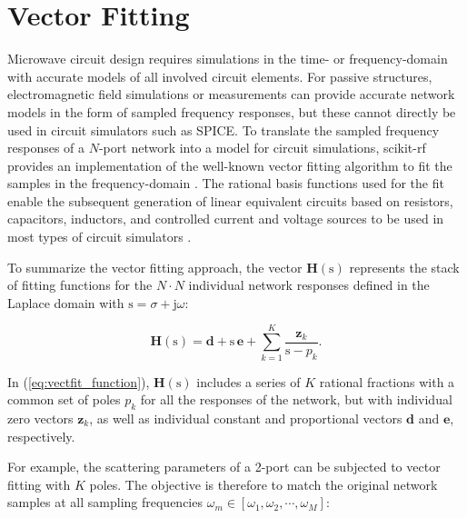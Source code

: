 \documentclass{IEEEjmw}
\begin{document}
\section{Vector Fitting}
Microwave circuit design requires simulations in the time- or frequency-domain with accurate models of all involved circuit elements. For passive structures, electromagnetic field simulations or measurements can provide accurate network models in the form of sampled frequency responses, but these cannot directly be used in circuit simulators such as SPICE. To translate the sampled frequency responses of a $N$-port network into a model for circuit simulations, scikit-rf provides an implementation of the well-known vector fitting algorithm to fit the samples in the frequency-domain \cite{vectfit}. The rational basis functions used for the fit enable the subsequent generation of linear equivalent circuits based on resistors, capacitors, inductors, and controlled current and voltage sources to be used in most types of circuit simulators \cite{vectfit_spice}. 

To summarize the vector fitting approach, the vector $\mathbf{H}(\mathrm{s})$ represents the stack of fitting functions for the $N \cdot N$ individual network responses defined in the Laplace domain with $\mathrm{s} = \sigma + \mathrm{j} \omega$:

\begin{equation}
\mathbf{H}(\mathrm{s}) = \mathbf{d} + \mathrm{s} \, \mathbf{e} + \sum _{k=1} ^{K} \frac{\mathbf{z}_k}{\mathrm{s} - p_k}.
\label{eq:vectfit_function}
\end{equation}

In (\ref{eq:vectfit_function}), $\mathbf{H}(\mathrm{s})$ includes a series of $K$ rational fractions with a common set of poles $p_k$ for all the responses of the network, but with individual zero vectors $\mathbf{z}_{k}$, as well as individual constant and proportional vectors $\mathbf{d}$ and $\mathbf{e}$, respectively.

For example, the scattering parameters of a 2-port can be subjected to vector fitting with $K$ poles. The objective is therefore to match the original network samples at all sampling frequencies $\omega_m \in [\omega_1, \omega_2, \cdots, \omega_M]$:
\end{document}
